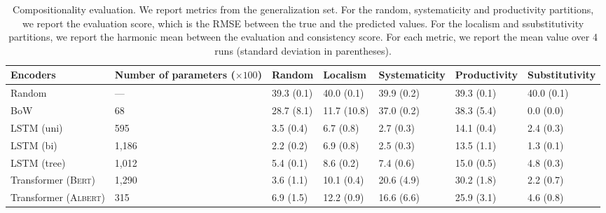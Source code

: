 \begin{table}[t]
    \footnotesize
    \begin{tabularx}{16cm}{lY|YYYYY}
    \toprule
    \textbf{Encoders} & \textbf{Number of parameters} ($\times 100$) & \textbf{Random} & \textbf{Localism} & \textbf{Systematicity} & \textbf{Productivity} & \textbf{Substitutivity} \\
    \midrule
    Random & --- & 39.3 {\scriptsize (0.1)} & 40.0 {\scriptsize (0.1)} & 39.9  {\scriptsize (0.2)} & 39.3 {\scriptsize (0.1)} & 40.0 {\scriptsize (0.1)} \\
    BoW & 68 & 28.7 {\scriptsize (8.1)} & 11.7 {\scriptsize (10.8)} & 37.0 {\scriptsize (0.2)} & 38.3 {\scriptsize (5.4)} & 0.0 {\scriptsize (0.0)} \\
    \addlinespace
    \textsc{LSTM} (uni) & 595 & 3.5 {\scriptsize (0.4)} & 6.7 {\scriptsize (0.8)} & 2.7 {\scriptsize (0.3)} & 14.1 {\scriptsize (0.4)} & 2.4 {\scriptsize (0.3)} \\
    \textsc{LSTM} (bi) & 1,186 & 2.2 {\scriptsize (0.2)} & 6.9 {\scriptsize (0.8)} & 2.5 {\scriptsize (0.3)} & 13.5 {\scriptsize (1.1)} & 1.3 {\scriptsize (0.1)} \\
    \textsc{LSTM} (tree) & 1,012 & 5.4 {\scriptsize (0.1)} & 8.6 {\scriptsize (0.2)} & 7.4 {\scriptsize (0.6)} & 15.0 {\scriptsize (0.5)} & 4.8 {\scriptsize (0.3)} \\
    \addlinespace
    Transformer (\textsc{Bert}) & 1,290 & 3.6 {\scriptsize (1.1)} & 10.1 {\scriptsize (0.4)} &  20.6 {\scriptsize (4.9)} & 30.2 {\scriptsize (1.8)} &	2.2 {\scriptsize (0.7)} \\
    Transformer (\textsc{Albert}) & 315 & 6.9 {\scriptsize (1.5)} & 12.2 {\scriptsize (0.9)} & 16.6 {\scriptsize (6.6)} & 25.9 {\scriptsize (3.1)} &	 4.6 {\scriptsize (0.8)} \\
    \bottomrule
    \end{tabularx}
    \caption{Compositionality evaluation. We report metrics from the generalization set. For the random, systematicity and productivity partitions, we report the evaluation score, which is the RMSE between the true and the predicted values. For the localism and ssubstitutivity partitions, we report the harmonic mean between the evaluation and consistency score. For each metric, we report the mean value over 4 runs (standard deviation in parentheses).} %
    \label{table:results-main}
\end{table}

